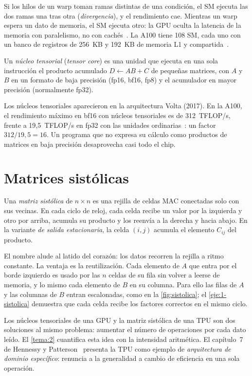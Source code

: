Si los hilos de un warp toman ramas distintas de una condición, el SM ejecuta las dos ramas una tras otra (\emph{divergencia}), y el rendimiento cae. Mientras un warp espera un dato de memoria, el SM ejecuta otro: la GPU oculta la latencia de la memoria con paralelismo, no con cachés~\cite{cmu418}. La A100 tiene 108 SM, cada uno con un banco de registros de 256~KB y 192~KB de memoria L1 y compartida~\cite{a100}.

\begin{definicion}
Un \emph{núcleo tensorial} (\emph{tensor core}) es una unidad que ejecuta en una sola instrucción el producto acumulado $D\gets AB+C$ de pequeñas matrices, con $A$ y $B$ en un formato de baja precisión (fp16, bf16, fp8) y el acumulador en mayor precisión (normalmente fp32).
\end{definicion}

Los núcleos tensoriales aparecieron en la arquitectura Volta (2017). En la A100, el rendimiento máximo en bf16 con núcleos tensoriales es de 312~TFLOP/s, frente a 19{,}5~TFLOP/s en fp32 con las unidades ordinarias~\cite{a100}: un factor $312/19{,}5=16$. Un programa que no expresa su cálculo como productos de matrices en baja precisión desaprovecha casi todo el chip.

\section{Matrices sistólicas}

\begin{definicion}
Una \emph{matriz sistólica} de $n\times n$ es una rejilla de celdas MAC conectadas solo con sus vecinas. En cada ciclo de reloj, cada celda recibe un valor por la izquierda y otro por arriba, acumula su producto y los reenvía a la derecha y hacia abajo. En la variante \emph{de salida estacionaria}, la celda $(i,j)$ acumula el elemento $C_{ij}$ del producto.
\end{definicion}

El nombre alude al latido del corazón: los datos recorren la rejilla a ritmo constante. La ventaja es la reutilización. Cada elemento de $A$ que entra por el borde izquierdo es usado por las $n$ celdas de su fila sin volver a leerse de memoria, y lo mismo cada elemento de $B$ en su columna. Para ello las filas de $A$ y las columnas de $B$ entran escalonadas, como en la \cref{fig:sistolica}; el \cref{eje:1-sistolica} demuestra que cada celda recibe los factores correctos en el mismo ciclo.

\addtocounter{figure}{1}%

\addtocounter{definicion}{1}%

\begin{observacion}
Los núcleos tensoriales de una GPU y la matriz sistólica de una TPU son dos soluciones al mismo problema: aumentar el número de operaciones por cada dato leído. El \cref{tema:2} cuantifica esta idea con la intensidad aritmética. El capítulo~7 de Hennessy y Patterson~\cite{hp} presenta la TPU como ejemplo de \emph{arquitectura de dominio específico}: renuncia a la generalidad a cambio de eficiencia en una sola operación.
\end{observacion}

